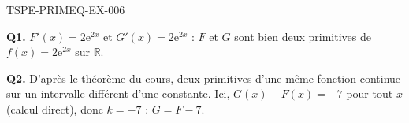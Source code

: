 \begin{corrige}{TSPE-PRIMEQ-EX-006}

\textbf{Q1.} $F'(x) = 2\mathrm{e}^{2x}$ et $G'(x) = 2\mathrm{e}^{2x}$ : $F$ et $G$ sont bien deux primitives de $f(x) = 2\mathrm{e}^{2x}$ sur $\mathbb{R}$.

\textbf{Q2.} D'après le théorème du cours, deux primitives d'une même fonction continue sur un intervalle différent d'une constante. Ici, $G(x)-F(x) = -7$ pour tout $x$ (calcul direct), donc $k=-7$ : $G = F - 7$.

\end{corrige}
